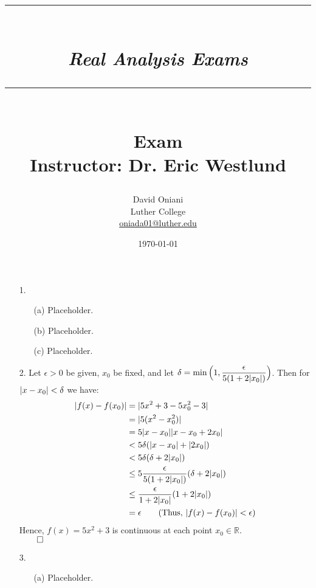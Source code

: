 \documentclass[11pt]{article}
\author{David Oniani\\
        Luther College\\
        \href{mailto:oniada01@luther.edu}{oniada01@luther.edu}}
\title{\rule{\paperwidth - 150pt}{1pt}\textbf{\\\textit{Real Analysis
Exams}\\}\rule {\paperwidth - 150pt}{1pt}\\\textbf{Exam
\textnumero4}\\{\normalsize Instructor: Dr. Eric Westlund}}
\date{\today}
\DeclarePairedDelimiter\abs{\lvert}{\rvert}%
\newcommand{\reals}{\mathbb{R}}
\begin{document}
\maketitle


\begin{itemize}
    \item[1.]
        \begin{itemize}
            \item[(a)]
                Placeholder.

            \item[(b)]
                Placeholder.

            \item[(c)]
                Placeholder.
        \end{itemize}

    \item[2.]
        Let $\epsilon > 0$ be given, $x_0$ be fixed, and let $\delta = \min
        \Big(1, \dfrac{\epsilon}{5(1 + 2\abs{x_0})}\Big)$. Then for $\abs{x -
        x_0} < \delta$ we have:
        \begin{align*}
            \abs{f(x) - f(x_0)} &= \abs{5x^2 + 3 - 5x_0^2 - 3}\\
                                &= \abs{5 (x^2 - x_0^2)}\\
                                &= 5 \abs{x - x_0} \abs{x - x_0 + 2x_0}\\
                                &< 5 \delta (\abs{x - x_0} + \abs{2x_0})\\
                                &< 5 \delta (\delta + 2\abs{x_0})\\
                                &\leq 5 \frac{\epsilon}{5(1 + 2\abs{x_0})} (\delta + 2\abs{x_0})\\
                                &\leq \frac{\epsilon}{1 + 2\abs{x_0}} (1 + 2\abs{x_0})\\
                                &= \epsilon
                                \tag{Thus, $\abs{f(x) - f(x_0)} < \epsilon$}
        \end{align*}
        Hence, $f(x) = 5x^2 + 3$ is continuous at each point $x_0 \in
        \reals$.\\
        $\qed$

    \item[3.]
        \begin{itemize}
            \item[(a)]
                Placeholder.


\end{itemize}
\end{itemize}
\end{document}
